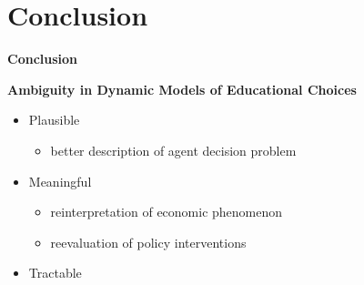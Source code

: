 \section{Conclusion}
\begin{frame}\begin{center}
\LARGE\textbf{Conclusion}
\end{center}\end{frame}
\begin{frame}
\textbf{Ambiguity in Dynamic Models of Educational Choices}\vspace{0.5cm}
\begin{itemize}\setlength\itemsep{1em}
\item Plausible
\begin{itemize}\setlength\itemsep{1em}
\item better description of agent decision problem
\end{itemize}
\item Meaningful\medskip
\begin{itemize}\setlength\itemsep{1em}
\item reinterpretation of economic phenomenon
\item reevaluation of policy interventions
\end{itemize}
\item Tractable
\end{itemize}
\end{frame}
